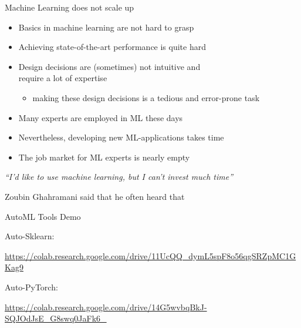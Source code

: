 \begin{frame}[c]{Machine Learning does not scale up}

\begin{itemize}
  \item Basics in machine learning are not hard to grasp
  \smallskip
  \pause
  \item Achieving state-of-the-art performance is quite hard
  \smallskip
  \pause
  \item Design decisions are (sometimes) not intuitive and\\ require a lot of expertise
  \begin{itemize}
    \item making these design decisions is a tedious and error-prone task
  \end{itemize}
  \pause
  \smallskip
  \item Many experts are employed in ML these days
  \smallskip
  \pause
  \item Nevertheless, developing new ML-applications takes time
  \smallskip
  \item The job market for ML experts is nearly empty
\end{itemize}

\bigskip

\textit{``I'd like to use machine learning, but I can't invest much time''}

\hfill Zoubin Ghahramani said that he often heard that


\end{frame}
\begin{frame}[c]{AutoML Tools Demo}

Auto-Sklearn:

\url{https://colab.research.google.com/drive/11UcQQ_dymL5spF8o56qgSRZpMC1GKag9}

\bigskip
Auto-PyTorch:

\url{https://colab.research.google.com/drive/14G5wvbqBkJ-SQJOdJsE_G8swq0JaFk6_}


\end{frame}
